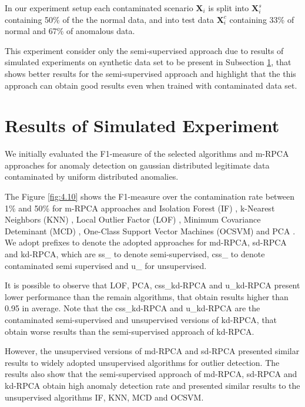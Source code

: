 In our experiment setup each contaminated scenario $\boldsymbol{X}_i$ is split into $\boldsymbol{X}_i^s$ containing 50\% of the the normal data, and into test data $\boldsymbol{X}_i^c$ containing 33\% of normal and 67\% of anomalous data. 

This experiment consider only the semi-supervised approach due to results of simulated experiments on synthetic data set to be present in Subsection \ref{sec:4_simulated_result}, that shows better results for the semi-supervised approach and highlight that the this approach can obtain good results even when trained with contaminated data set.

\section{Results of Simulated Experiment}
\label{sec:4_simulated_result}

We initially evaluated the F1-measure of the selected algorithms and m-RPCA approaches for anomaly detection on gaussian distributed legitimate data contaminated by uniform distributed anomalies. 

The Figure \ref{fig:4.10} shows the F1-measure over the contamination rate between 1\% and 50\% for m-RPCA approaches and Isolation Forest (IF) \cite{liu2008isolation}, k-Nearest Neighbors (KNN) \cite{angiulli2002fast}, Local Outlier Factor (LOF) \cite{breunig2000lof}, Minimum Covariance Deteminant (MCD) \cite{rousseeuw1999fastmcd}, One-Class Support Vector Machines (OCSVM) \cite{scholkopf2001estimating} and PCA \cite{shyu2003novel}. We adopt prefixes to denote the adopted approaches for md-RPCA, sd-RPCA and kd-RPCA, which are ss\_ to denote semi-supervised, css\_ to denote contaminated semi supervised and u\_ for unsupervised.

It is possible to observe that LOF, PCA, css\_kd-RPCA and u\_kd-RPCA present lower performance than the remain algorithms, that obtain results higher than 0.95 in average. Note that the css\_kd-RPCA and u\_kd-RPCA are the contaminated semi-supervised and unsupervised versions of kd-RPCA, that obtain worse results than the semi-supervised approach of kd-RPCA. 

However, the unsupervised versions of md-RPCA and sd-RPCA presented similar results to widely adopted unsupervised algorithms for outlier detection. The results also show that the semi-supervised approach of md-RPCA, sd-RPCA and kd-RPCA obtain high anomaly detection rate and presented similar results to the unsupervised algorithms IF, KNN, MCD and OCSVM. 

